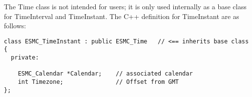 
The Time class is not intended for users; it is only used internally as a base
class for TimeInterval and TimeInstant.  The C++ definition for
TimeInstant are as follows:

\begin{verbatim}
class ESMC_TimeInstant : public ESMC_Time   // <== inherits base class
{
  private:

    ESMC_Calendar *Calendar;    // associated calendar
    int Timezone;               // Offset from GMT
};
\end{verbatim}
